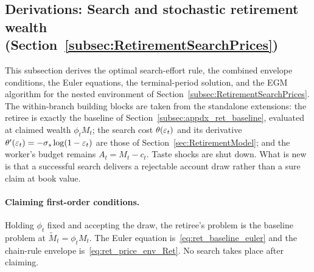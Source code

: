 \subsection{Derivations: Search and stochastic retirement wealth (Section~\ref{subsec:RetirementSearchPrices})}\label{subsec:appdx_ret_full}
This subsection derives the optimal search-effort rule, the combined envelope conditions, the Euler equations, the terminal-period solution, and the EGM algorithm for the nested environment of Section~\ref{subsec:RetirementSearchPrices}. The within-branch building blocks are taken from the standalone extensions: the retiree is exactly the baseline of Section~\ref{subsec:appdx_ret_baseline}, evaluated at claimed wealth $\phi_t M_t$; the search cost $\theta(\varepsilon_t)$ and its derivative $\theta'(\varepsilon_t)=-\sigma_s\log(1-\varepsilon_t)$ are those of Section~\ref{sec:RetirementModel}; and the worker's budget remains $A_t=M_t-c_t$. Taste shocks are shut down. What is new is that a successful search delivers a rejectable account draw rather than a sure claim at book value.

\paragraph{Claiming first-order conditions.}
Holding $\phi_t$ fixed and accepting the draw, the retiree's problem is the baseline problem at $\tilde M_t=\phi_t M_t$. The Euler equation is~\eqref{eq:ret_baseline_euler} and the chain-rule envelope is~\eqref{eq:ret_price_env_Ret}. No search takes place after claiming.

